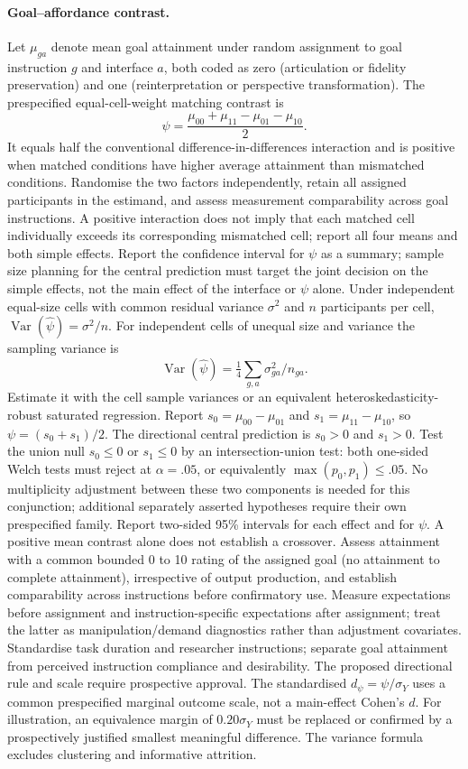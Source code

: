 \paragraph{Goal--affordance contrast.} Let $\mu_{ga}$ denote mean goal attainment under random assignment to goal instruction $g$ and interface $a$, both coded as zero (articulation or fidelity preservation) and one (reinterpretation or perspective transformation). The prespecified equal-cell-weight matching contrast is
\[
 \psi=\frac{\mu_{00}+\mu_{11}-\mu_{01}-\mu_{10}}{2}.
\]
It equals half the conventional difference-in-differences interaction and is positive when matched conditions have higher average attainment than mismatched conditions. Randomise the two factors independently, retain all assigned participants in the estimand, and assess measurement comparability across goal instructions. A positive interaction does not imply that each matched cell individually exceeds its corresponding mismatched cell; report all four means and both simple effects. Report the confidence interval for $\psi$ as a summary; sample size planning for the central prediction must target the joint decision on the simple effects, not the main effect of the interface or $\psi$ alone. Under independent equal-size cells with common residual variance $\sigma^2$ and $n$ participants per cell, $\operatorname{Var}(\hat\psi)=\sigma^2/n$. For independent cells of unequal size and variance the sampling variance is
\[
 \operatorname{Var}(\hat\psi)=\tfrac14\sum_{g,a}\sigma_{ga}^2/n_{ga}.
\]
Estimate it with the cell sample variances or an equivalent heteroskedasticity-robust saturated regression. Report $s_0=\mu_{00}-\mu_{01}$ and $s_1=\mu_{11}-\mu_{10}$, so $\psi=(s_0+s_1)/2$. The directional central prediction is $s_0>0$ and $s_1>0$. Test the union null $s_0\leq0$ or $s_1\leq0$ by an intersection-union test: both one-sided Welch tests must reject at $\alpha=.05$, or equivalently $\max(p_0,p_1)\leq.05$. No multiplicity adjustment between these two components is needed for this conjunction; additional separately asserted hypotheses require their own prespecified family. Report two-sided 95\% intervals for each effect and for $\psi$. A positive mean contrast alone does not establish a crossover. Assess attainment with a common bounded 0 to 10 rating of the assigned goal (no attainment to complete attainment), irrespective of output production, and establish comparability across instructions before confirmatory use. Measure expectations before assignment and instruction-specific expectations after assignment; treat the latter as manipulation/demand diagnostics rather than adjustment covariates. Standardise task duration and researcher instructions; separate goal attainment from perceived instruction compliance and desirability. The proposed directional rule and scale require prospective approval. The standardised $d_\psi=\psi/\sigma_Y$ uses a common prespecified marginal outcome scale, not a main-effect Cohen's $d$. For illustration, an equivalence margin of $0.20\sigma_Y$ must be replaced or confirmed by a prospectively justified smallest meaningful difference. The variance formula excludes clustering and informative attrition.

